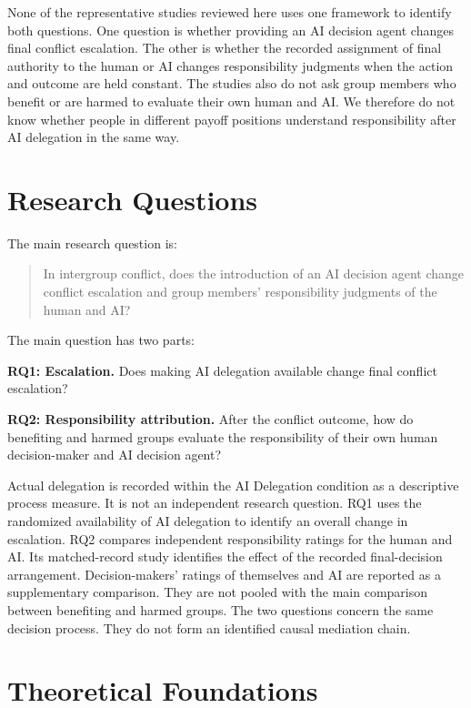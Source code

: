 \documentclass[11pt,a4paper]{article}
\begin{document}
None of the representative studies reviewed here uses one framework to identify both questions. One question is whether providing an AI decision agent changes final conflict escalation. The other is whether the recorded assignment of final authority to the human or AI changes responsibility judgments when the action and outcome are held constant. The studies also do not ask group members who benefit or are harmed to evaluate their own human and AI. We therefore do not know whether people in different payoff positions understand responsibility after AI delegation in the same way.

\section{Research Questions}

The main research question is:

\begin{quote}
In intergroup conflict, does the introduction of an AI decision agent change conflict escalation and group members' responsibility judgments of the human and AI?
\end{quote}

The main question has two parts:

\textbf{RQ1: Escalation.} Does making AI delegation available change final conflict escalation?

\textbf{RQ2: Responsibility attribution.} After the conflict outcome, how do benefiting and harmed groups evaluate the responsibility of their own human decision-maker and AI decision agent?

Actual delegation is recorded within the AI Delegation condition as a descriptive process measure. It is not an independent research question. RQ1 uses the randomized availability of AI delegation to identify an overall change in escalation. RQ2 compares independent responsibility ratings for the human and AI. Its matched-record study identifies the effect of the recorded final-decision arrangement. Decision-makers' ratings of themselves and AI are reported as a supplementary comparison. They are not pooled with the main comparison between benefiting and harmed groups. The two questions concern the same decision process. They do not form an identified causal mediation chain.

\section{Theoretical Foundations}
\end{document}
